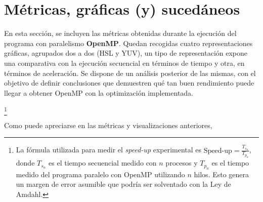 \section{Métricas, gráficas (y) sucedáneos}
En esta sección, se incluyen las métricas obtenidas durante la ejecución del programa con paralelismo \textbf{OpenMP}. Quedan recogidas cuatro representaciones gráficas, agrupados dos a dos (HSL y YUV), un tipo de representación expone una comparativa con la ejecución secuencial en términos de tiempo y otra, en términos de aceleración. Se dispone de un análisis posterior de las mismas, con el objetivo de definir conclusiones que demuestren qué tan buen rendimiento puede llegar a obtener OpenMP con la optimización implementada.


\footnote{\label{note:speedup}La fórmula utilizada para medir el \textit{speed-up} experimental es 
$\text{Speed-up} = \frac{T_{s_n}}{T_{p_n}}$, donde $T_{s_n}$ es el tiempo secuencial medido con $n$ procesos y $T_{p_n}$ es el tiempo medido del programa paralelo con OpenMP utilizando $n$ hilos. Esto genera un margen de error asumible que podría ser solventado con la Ley de Amdahl.}

Como puede apreciarse en las métricas y visualizaciones anteriores, 